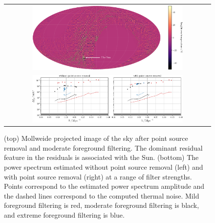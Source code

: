 \begin{bibunit}
\begin{figure}
    \centering
    \begin{tabular}{c}
        \includegraphics[width=0.75\textwidth]{figures/chapter4/filtered-sky-map-colorbar}\\
        \includegraphics[width=0.75\textwidth]{figures/chapter4/spherical-power-spectrum-filter-strength}\\
    \end{tabular}
    \caption{
        (top) Mollweide projected image of the sky after point source removal and moderate
        foreground filtering. The dominant residual feature in the residuals is associated with the
        Sun.
        (bottom) The power spectrum estimated without point source removal (left) and with point
        source removal (right) at a range of filter strengths. Points correspond to the estimated
        power spectrum amplitude and the dashed lines correspond to the computed thermal noise.
        Mild foreground filtering is red, moderate foreground filtering is black, and extreme
        foreground filtering is blue.
    }
    \label{fig:spherical-power-spectra-filter-strength}
\end{figure}


\end{bibunit}
